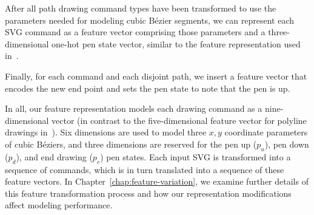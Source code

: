 After all path drawing command types have been transformed to use the parameters needed for modeling cubic B\'ezier segments, we can represent each SVG command as a feature vector comprising those parameters and a three-dimensional one-hot pen state vector, similar to the feature representation used in~\cite{ha2017neural}.

Finally, for each  command and each disjoint path, we insert a feature vector that encodes the new end point and sets the pen state to note that the pen is up.

In all, our feature representation models each drawing command as a nine-dimensional vector (in contrast to the five-dimensional feature vector for polyline drawings in~\cite{ha2017neural}).
Six dimensions are used to model three $x, y$ coordinate parameters of cubic B\'eziers, and three dimensions are reserved for the pen up ($p_u$), pen down ($p_d$), and end drawing ($p_e$) pen states.
Each input SVG is transformed into a sequence of commands, which is in turn translated into a sequence of these feature vectors.
In Chapter~\ref{chap:feature-variation}, we examine further details of this feature transformation process and how our representation modifications affect modeling performance.
